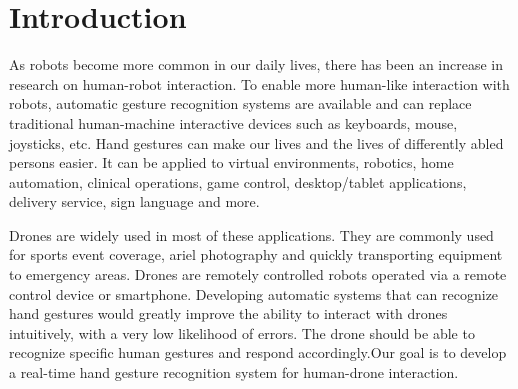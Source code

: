 \clearpage
\chapter{Introduction}
\label{ch:intro}

As robots become more common in our daily lives, there has been an increase in research on human-robot interaction. To enable more human-like interaction with robots, automatic gesture recognition systems are available and can replace traditional human-machine interactive devices such as keyboards, mouse, joysticks, etc.  Hand gestures can make our lives and the lives of differently abled persons easier. It can be applied to virtual environments, robotics, home automation, clinical operations, game control, desktop/tablet applications, delivery service, sign language and more. 

Drones are widely used in most of these applications. They are commonly used for sports event coverage, ariel photography and quickly transporting equipment to emergency areas.  Drones are remotely controlled robots operated via a remote control device or smartphone. Developing automatic systems that can recognize hand gestures would greatly improve the ability to interact with drones intuitively, with a very low likelihood of errors. The drone should be able to recognize specific human gestures and respond accordingly.Our goal is to develop a real-time hand gesture recognition system for human-drone interaction.


